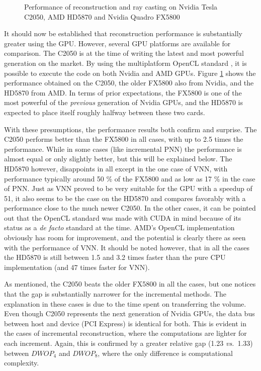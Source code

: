 \begin{figure}[h]
	\caption[Performance of reconstruction and ray casting]{Performance of reconstruction and ray casting on Nvidia Tesla C2050, AMD HD5870 and Nvidia Quadro FX5800}
	\label{fig:platforms_performance}
	\end{figure}
	
	It should now be established that reconstruction performance is substantially greater using the GPU. However, several GPU platforms are available for comparison. The C2050 is at the time of writing the latest and most powerful generation on the market. By using the multiplatform OpenCL standard \cite{openclspec}, it is possible to execute the code on both Nvidia and AMD GPUs. Figure \ref{fig:platforms_performance} shows the performance obtained on the C2050, the older FX5800 also from Nvidia, and the HD5870 from AMD. In terms of prior expectations, the FX5800 is one of the most powerful of the \emph{previous} generation of Nvidia GPUs, and the HD5870 is expected to place itself roughly halfway between these two cards.
	
	With these presumptions, the performance results both confirm and surprise. The C2050 performs better than the FX5800 in all cases, with up to 2.5 times the performance. While in some cases (like incremental PNN) the performance is almost equal or only slightly better, but this will be explained below. The HD5870 however, disappoints in all except in the one case of VNN, with performance typically around 50 \% of the FX5800 and as low as 17 \% in the case of PNN. Just as VNN proved to be very suitable for the GPU with a speedup of 51, it also seems to be the case on the HD5870 and compares favorably with a performance close to the much newer C2050. In the other cases, it can be pointed out that the OpenCL standard was made with CUDA in mind because of its status as a \emph{de facto} standard at the time. AMD's OpenCL implementation obviously has room for improvement, and the potential is clearly there as seen with the performance of VNN. It should be noted however, that in all the cases the HD5870 is still between 1.5 and 3.2 times faster than the pure CPU implementation (and 47 times faster for VNN).
	
	As mentioned, the C2050 beats the older FX5800 in all the cases, but one notices that the gap is substantially narrower for the incremental methods. The explanation in these cases is due to the time spent on transferring the volume. Even though C2050 represents the next generation of Nvidia GPUs, the data bus between host and device (PCI Express) is identical for both. This is evident in the cases of incremental reconstruction, where the computations are lighter for each increment. Again, this is confirmed by a greater relative gap (1.23 \textit{vs.}\ 1.33) between $DWOP_4$ and $DWOP_8$, where the only difference is computational complexity.
	
